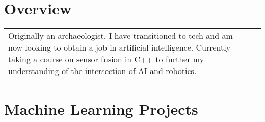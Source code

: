 \documentclass[letterpaper]{resume}
\begin{document}
\author{Sarah F. Majors}
\maketitle

\section{Overview}
\goodbreak\vspace{\secskip}\par\noindent\begin{tabularx}{\linewidth}{Xr}  
  Originally an archaeologist, I have transitioned to tech and am now looking to obtain a job in artificial intelligence.  Currently taking a course on sensor fusion in C++ to further my understanding of the intersection of AI and robotics.
\end{tabularx}


\section{Machine Learning Projects}
\end{document}
